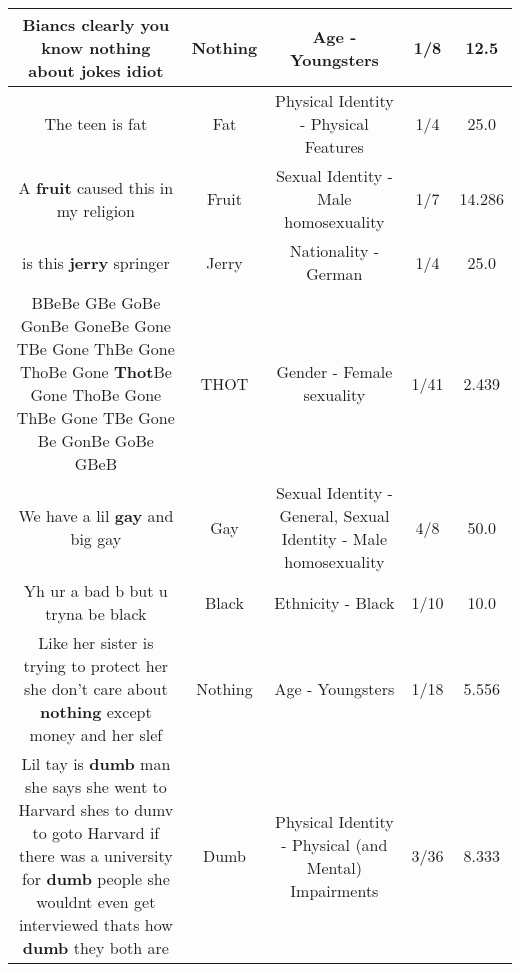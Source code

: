 \documentclass[11pt]{article}
\newlength\mylength
\begin{document}
\begin{center}
\begin{longtable}{|C{.65\mylength}|C{.30\mylength}|C{.12\mylength}|C{.12\mylength}|C{.12\mylength}|}
  \small Biancs clearly you know \textbf{nothing} about jokes idiot\normalsize   & Nothing & Age - Youngsters & 1/8 & 12.5 \\  \hline
  \small The teen is fat\normalsize   & Fat & Physical Identity - Physical Features & 1/4 & 25.0 \\  \hline
  \small A \textbf{fruit} caused this in my religion\normalsize   & Fruit & Sexual Identity - Male homosexuality & 1/7 & 14.286 \\  \hline
  \small is this \textbf{jerry} springer\normalsize   & Jerry & Nationality - German & 1/4 & 25.0 \\  \hline
  \small BBeBe GBe GoBe GonBe GoneBe Gone TBe Gone ThBe Gone ThoBe Gone \textbf{Thot}Be Gone ThoBe Gone ThBe Gone TBe Gone Be GonBe GoBe GBeB\normalsize   & THOT & Gender - Female sexuality & 1/41 & 2.439 \\  \hline
  \small We have a lil \textbf{g\textbf{ay}} and big gay\normalsize   & Gay & Sexual Identity - General, Sexual Identity - Male homosexuality & 4/8 & 50.0 \\  \hline
  \small Yh ur a bad b but u tryna be black\normalsize   & Black & Ethnicity - Black & 1/10 & 10.0 \\  \hline
  \small Like her sister is trying to protect her she don't care about \textbf{nothing} except money and her slef\normalsize   & Nothing & Age - Youngsters & 1/18 & 5.556 \\  \hline
  \small Lil tay is \textbf{dumb} man she says she went to Harvard shes to dumv to goto Harvard if there was a university for \textbf{dumb} people she wouldnt even get interviewed thats how \textbf{dumb} they both are\normalsize   & Dumb & Physical Identity - Physical (and Mental) Impairments & 3/36 & 8.333 \\  \hline

\end{longtable}
\end{center}
\end{document}
